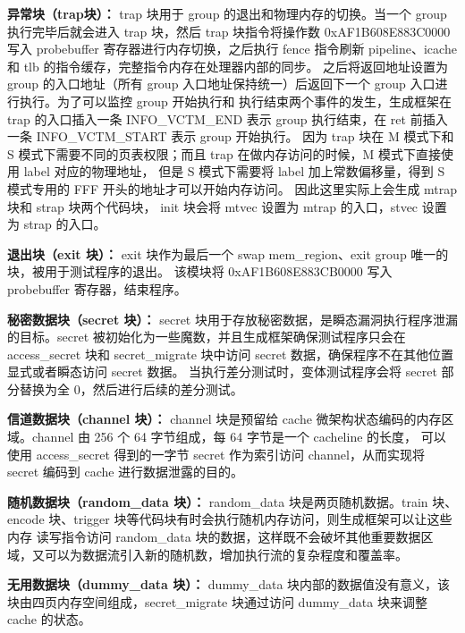 \textbf{异常块（trap块）：}
trap 块用于 group 的退出和物理内存的切换。当一个 group 执行完毕后就会进入 trap 块，然后 trap 块指令将操作数 0xAF1B608E883C0000
写入 probebuffer 寄存器进行内存切换，之后执行 fence 指令刷新 pipeline、icache 和 tlb 的指令缓存，完整指令内存在处理器内部的同步。
之后将返回地址设置为 group 的入口地址（所有 group 入口地址保持统一）后返回下一个 group 入口进行执行。为了可以监控 group 开始执行和
执行结束两个事件的发生，生成框架在 trap 的入口插入一条 INFO\_VCTM\_END 表示 group 执行结束，在 ret 前插入一条 INFO\_VCTM\_START 表示 group 开始执行。
因为 trap 块在 M 模式下和 S 模式下需要不同的页表权限；而且 trap 在做内存访问的时候，M 模式下直接使用 label 对应的物理地址，
但是 S 模式下需要将 label 加上常数偏移量，得到 S 模式专用的 FFF 开头的地址才可以开始内存访问。
因此这里实际上会生成 mtrap 块和 strap 块两个代码块，
init 块会将 mtvec 设置为 mtrap 的入口，stvec 设置为 strap 的入口。\par

\textbf{退出块（exit 块）：}
exit 块作为最后一个 swap mem\_region、exit group 唯一的块，被用于测试程序的退出。
该模块将 0xAF1B608E883CB0000 写入 probebuffer 寄存器，结束程序。\par

\textbf{秘密数据块（secret 块）：}
secret 块用于存放秘密数据，是瞬态漏洞执行程序泄漏的目标。secret 被初始化为一些魔数，并且生成框架确保测试程序只会在
 access\_secret 块和 secret\_migrate 块中访问 secret 数据，确保程序不在其他位置显式或者瞬态访问 secret 数据。
当执行差分测试时，变体测试程序会将 secret 部分替换为全 0，然后进行后续的差分测试。\par

\textbf{信道数据块（channel 块）：}
channel 块是预留给 cache 微架构状态编码的内存区域。channel 由 256 个 64 字节组成，每 64 字节是一个 cacheline 的长度，
可以使用 access\_secret 得到的一字节 secret 作为索引访问 channel，从而实现将 secret 编码到 cache 进行数据泄露的目的。\par

\textbf{随机数据块（random\_data 块）：}
random\_data 块是两页随机数据。train 块、encode 块、trigger 块等代码块有时会执行随机内存访问，则生成框架可以让这些内存
读写指令访问 random\_data 块的数据，这样既不会破坏其他重要数据区域，又可以为数据流引入新的随机数，增加执行流的复杂程度和覆盖率。\par

\textbf{无用数据块（dummy\_data 块）：}
dummy\_data 块内部的数据值没有意义，该块由四页内存空间组成，secret\_migrate 块通过访问 dummy\_data 块来调整 cache 的状态。\par

